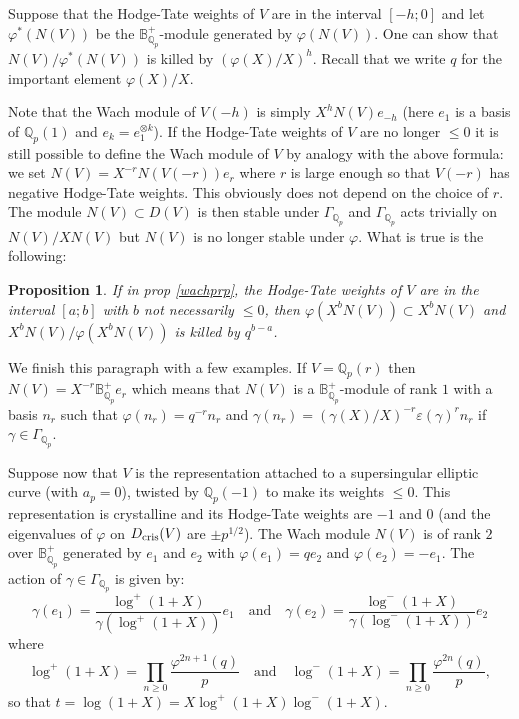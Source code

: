 \documentclass[11pt]{amsart}
\def\Q{{\mathbb Q}_p}
\def\Qp{{\mathbb Q}_p}
\def\eps{\varepsilon}
\def\bplus{\mathbb{B}^+}
\def\dcris{D_{\rm cris}}
\newtheorem{prop}[definit]{\bf{Proposition}}
\begin{document}
Suppose that the Hodge-Tate weights of $V$ are in the interval 
$[-h;0]$ and 
let $\varphi^*(N(V))$ be the $\bplus_{\Q}$-module generated by 
$\varphi(N(V))$. One can show that $N(V) / \varphi^*(N(V))$ is killed by 
$(\varphi(X)/X)^h$. Recall that we write $q$ for the important element
$\varphi(X)/X$. 
 
Note that the Wach module of $V(-h)$ is simply $X^h N(V) e_{-h}$ 
(here $e_1$ is a basis of $\Qp(1)$ and $e_k=e_1^{\otimes k}$).  
If the Hodge-Tate weights of $V$ are no longer $\leq 0$ it is still 
possible to define the Wach module of $V$ by analogy with the above 
formula: we set $N(V) = X^{-r} N(V(-r)) e_r$  
where $r$ is large enough 
so that $V(-r)$ has negative Hodge-Tate weights. This obviously does 
not depend on the choice of $r$. The module $N(V) \subset D(V)$ is 
then stable under $\Gamma_{\Q}$ and $\Gamma_{\Q}$ acts trivially on 
$N(V)/X N(V)$ but $N(V)$ is no longer stable under $\varphi$. What is 
true is the following: 
\begin{prop}\label{wachcomplem} 
If in prop \ref{wachprp}, 
the Hodge-Tate weights of $V$ are in the interval 
$[a;b]$ with $b$ not necessarily $\leq 0$,  
then $\varphi(X^b N(V)) \subset X^b N(V)$ and $X^b 
N(V) / \varphi(X^b N(V))$ is killed by $q^{b-a}$.  
\end{prop} 
 
We finish this paragraph with a few examples. If $V=\Q(r)$ then 
$N(V)=X^{-r} \bplus_{\Q} e_r$ which means that $N(V)$ is a 
$\bplus_{\Q}$-module of rank $1$ with a basis $n_r$ such that $\varphi(n_r) 
= q^{-r} n_r$ and $\gamma(n_r) = (\gamma(X)/X)^{-r} 
\eps(\gamma)^r n_r$ if $\gamma \in \Gamma_{\Q}$.  
 
Suppose now that $V$ is the representation attached to a supersingular 
elliptic curve (with $a_p=0$), twisted by $\Q(-1)$ to make its weights 
$\leq 0$. This representation is crystalline and 
its Hodge-Tate weights are $-1$ and $0$ 
(and the eigenvalues of $\varphi$ on $\dcris(V)$ are 
$\pm p^{1/2}$).  
The Wach module $N(V)$ is of rank $2$ 
over $\bplus_{\Q}$ generated by $e_1$ and $e_2$ with 
$\varphi(e_1)=q e_2$ and $\varphi(e_2)=  - e_1$. 
The action of $\gamma \in \Gamma_{\Q}$ 
is given by: 
\[ \gamma(e_1)=\frac{\log^+(1+X)}{\gamma(\log^+(1+X))} e_1 \quad\text{and}\quad  
\gamma(e_2)=\frac{\log^-(1+X)}{\gamma(\log^-(1+X))} e_2 \] where 
\[ \log^+(1+X) =\prod_{n \geq 0} \frac{\varphi^{2n+1}(q)}{p}  
\quad\text{and}\quad 
\log^-(1+X) =\prod_{n \geq 0} \frac{\varphi^{2n}(q)}{p},  \] 
so that $t=\log(1+X)=X \log^+(1+X) \log^-(1+X)$.  
 
\end{document}
